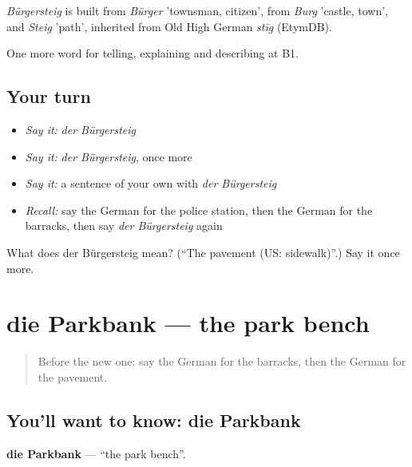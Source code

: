 \begin{cousinweb}
\emph{Bürgersteig} is built from \emph{Bürger} 'townsman, citizen', from \emph{Burg} 'castle, town', and \emph{Steig} 'path', inherited from Old High German \emph{stīg} (EtymDB).
\end{cousinweb}

\begin{grammarlens}[title={What you've built}]
One more word for telling, explaining and describing at B1.
\end{grammarlens}

\subsection*{Your turn}
\begin{itemize}
\raggedright
  \item \emph{Say it:} \emph{der Bürgersteig}
  \item \emph{Say it:} \emph{der Bürgersteig}, once more
  \item \emph{Say it:} a sentence of your own with \emph{der Bürgersteig}
  \item \emph{Recall:} say the German for the police station, then the German for the barracks, then say \emph{der Bürgersteig} again
\end{itemize}

\begin{tcolorbox}[breakable,colback=teal!4,colframe=teal!35!black,title={Before you move on}]
What does der Bürgersteig mean? (\textquotedblleft{}The pavement (US: sidewalk)\textquotedblright{}.) Say it once more.
\end{tcolorbox}
\section[die Parkbank]{die Parkbank — the park bench}

\label{lesson:GE-C440-parkbank}



\begin{quote}
Before the new one: say the German for the barracks, then the German for the pavement.
\end{quote}

\subsection*{You'll want to know: die Parkbank}
\textbf{die Parkbank} — \textquotedblleft{}the park bench\textquotedblright{}.

